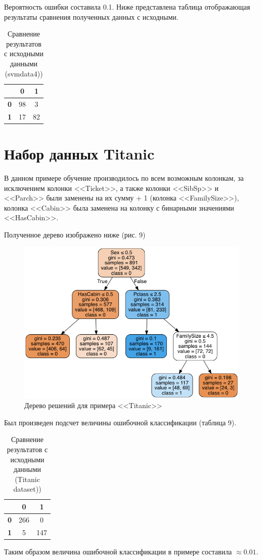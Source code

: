 \documentclass[]{article}
\numberwithin{equation}{section}
\begin{document}
        Вероятность ошибки составила 0.1. Ниже представлена таблица отображающая результаты сравнения полученных данных с исходными.

        \begin{table}[H]
            \centering
            \begin{tabular}{|c|c|c|}
              \hline
                & \textbf{0} & \textbf{1} \\
              \hline
              \textbf{0} & 98 & 3\\
              \hline
              \textbf{1} & 17 & 82 \\
              \hline
            \end{tabular}
            \caption{Сравнение результатов с исходными данными (svmdata4))}
        \end{table}

    \section{Набор данных Titanic}

    В данном примере обучение производилось по всем возможным колонкам, за исключением колонки <<Ticket>>, а также колонки <<SibSp>> и <<Parch>> были заменены на их сумму + 1 (колонка <<FamilySize>>), колонка <<Cabin>> была заменена на колонку с бинарными значениями <<HasCabin>>.

    Полученное дерево изображено ниже (рис. 9)

    \begin{figure}[H]
        \centering
        \includegraphics[width = 0.7\linewidth]{data/titanic_tree.png}
        \caption{Дерево решений для примера <<Titanic>>}
    \end{figure}

    Был произведен подсчет величины ошибочной классификации (таблица 9).

    \begin{table}[H]
        \centering
        \begin{tabular}{|c|c|c|}
          \hline
            & \textbf{0} & \textbf{1} \\
          \hline
          \textbf{0} & 266 & 0\\
          \hline
          \textbf{1} & 5 & 147 \\
          \hline
        \end{tabular}
        \caption{Сравнение результатов с исходными данными (Titanic dataset))}
    \end{table}

    Таким образом величина ошибочной классификации в примере составила $\approx0.01$.
\end{document}
